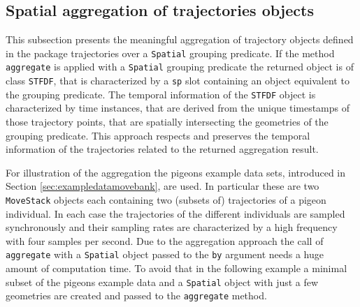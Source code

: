 \documentclass[12pt, oneside, a4paper]{scrbook}
\newcommand{\pkg}[1]{{\normalfont\fontseries{b}\selectfont #1}}
\let\code=\texttt
\begin{document}
% 
% 




\subsection{Spatial aggregation of \pkg{trajectories} objects}
\label{subsec:aggregationbysp}

This subsection presents the meaningful aggregation of trajectory objects defined in the package \pkg{trajectories} over a \code{Spatial} grouping predicate. If the method \code{aggregate} is applied with a \code{Spatial} grouping predicate the returned object is of class \code{STFDF}, that is characterized by a \code{sp} slot containing an object equivalent to the grouping predicate. The temporal information of the \code{STFDF} object is characterized by time instances, that are derived from the unique timestamps of those trajectory points, that are spatially intersecting the geometries of the grouping predicate. This approach respects and preserves the temporal information of the trajectories related to the returned aggregation result.
\par\medskip

For illustration of the aggregation the pigeons example data sets, introduced in Section \ref{sec:exampledatamovebank}, are used. In particular these are two \code{MoveStack} objects each containing two (subsets of) trajectories of a pigeon individual. In each case the trajectories of the different individuals are sampled synchronously and their sampling rates are characterized by a high frequency with four samples per second. 
Due to the aggregation approach the call of \code{aggregate} with a \code{Spatial} object passed to the \code{by} argument needs a huge amount of computation time. To avoid that in the following example a minimal subset of the pigeons example data and a \code{Spatial} object with just a few geometries are created and passed to the \code{aggregate} method.
\par\medskip
\end{document}
